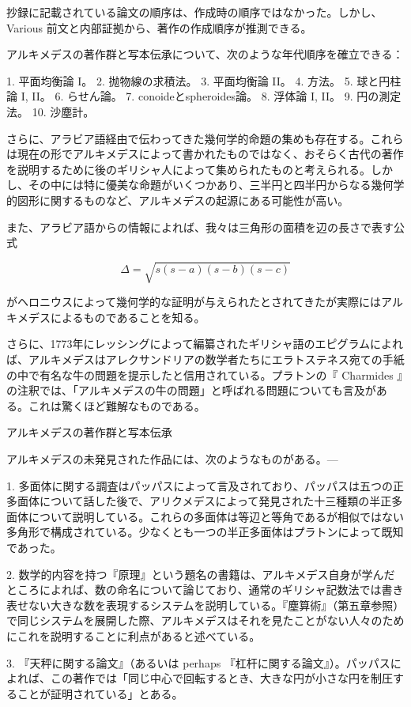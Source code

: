 \documentclass[a4paper,11pt,openany]{ltjsbook}
\begin{document}
抄録に記載されている論文の順序は、作成時の順序ではなかった。しかし、 Various 前文と内部証拠から、著作の作成順序が推測できる。

アルキメデスの著作群と写本伝承について、次のような年代順序を確立できる：

1. 平面均衡論 I。
2. 抛物線の求積法。
3. 平面均衡論 II。
4. 方法。
5. 球と円柱論 I, II。
6. らせん論。
7. conoideとspheroides論。
8. 浮体論 I, II。
9. 円の測定法。
10. 沙塵計。

さらに、アラビア語経由で伝わってきた幾何学的命題の集めも存在する。これらは現在の形でアルキメデスによって書かれたものではなく、おそらく古代の著作を説明するために後のギリシャ人によって集められたものと考えられる。しかし、その中には特に優美な命題がいくつかあり、三半円と四半円からなる幾何学的図形に関するものなど、アルキメデスの起源にある可能性が高い。

また、アラビア語からの情報によれば、我々は三角形の面積を辺の長さで表す公式

\[
\Delta = \sqrt{s(s - a)(s - b)(s - c)}
\]

がヘロニウスによって幾何学的な証明が与えられたとされてきたが実際にはアルキメデスによるものであることを知る。

さらに、1773年にレッシングによって編纂されたギリシャ語のエピグラムによれば、アルキメデスはアレクサンドリアの数学者たちにエラトステネス宛ての手紙の中で有名な牛の問題を提示したと信用されている。プラトンの『 Charmides 』の注釈では、「アルキメデスの牛の問題」と呼ばれる問題についても言及がある。これは驚くほど難解なものである。

アルキメデスの著作群と写本伝承

アルキメデスの未発見された作品には、次のようなものがある。—

1. 多面体に関する調査はパッパスによって言及されており、パッパスは五つの正多面体について話した後で、アリクメデスによって発見された十三種類の半正多面体について説明している。これらの多面体は等辺と等角であるが相似ではない多角形で構成されている。少なくとも一つの半正多面体はプラトンによって既知であった。

2. 数学的内容を持つ『原理』という題名の書籍は、アルキメデス自身が学んだところによれば、数の命名について論じており、通常のギリシャ記数法では書き表せない大きな数を表現するシステムを説明している。『塵算術』（第五章参照）で同じシステムを展開した際、アルキメデスはそれを見たことがない人々のためにこれを説明することに利点があると述べている。

3. 『天秤に関する論文』（あるいは perhaps 『杠杆に関する論文』）。パッパスによれば、この著作では「同じ中心で回転するとき、大きな円が小さな円を制圧することが証明されている」とある。
\end{document}
